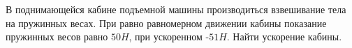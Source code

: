 В поднимающейся кабине подъемной машины производиться взвешивание тела на 
пружинных весах. При равно равномерном движении кабины показание 
пружинных весов равно $50 H$, при ускоренном -$51 H$. Найти ускорение
кабины.
 